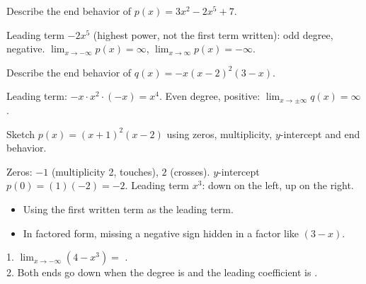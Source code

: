 Describe the end behavior of $p(x)=3x^2-2x^5+7$.
\begin{workspace}[2.2cm]
Leading term $-2x^5$ (highest power, not the first term written): odd degree, negative. $\lim_{x\to-\infty}p(x)=\infty$, $\lim_{x\to\infty}p(x)=-\infty$.
\end{workspace}

Describe the end behavior of $q(x)=-x(x-2)^2(3-x)$.
\begin{workspace}[2.2cm]
Leading term: $-x\cdot x^2\cdot(-x)=x^4$. Even degree, positive: $\lim_{x\to\pm\infty}q(x)=\infty$.
\end{workspace}

Sketch $p(x)=(x+1)^2(x-2)$ using zeros, multiplicity, $y$-intercept and end behavior.
\begin{workspace}[5.2cm]
Zeros: $-1$ (multiplicity 2, touches), $2$ (crosses). $y$-intercept $p(0)=(1)(-2)=-2$. Leading term $x^3$: down on the left, up on the right.
\begin{center}
\end{center}
\end{workspace}

\begin{mistakes}
\begin{itemize}
\item Using the first written term as the leading term.
\item In factored form, missing a negative sign hidden in a factor like $(3-x)$.
\end{itemize}
\end{mistakes}

\begin{quickcheck}
1. $\lim_{x\to-\infty}(4-x^3)=$ \fillin{$\infty$}.\\
2. Both ends go down when the degree is  and the leading coefficient is .
\end{quickcheck}


